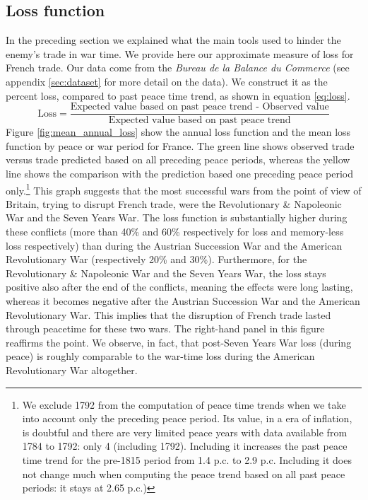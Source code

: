 \documentclass[12pt,a4paper,notitlepage,english]{article}
\begin{document}
\subsection{Loss function}
\label{sec:loss}
In the preceding section we explained what the main tools used to hinder the enemy's trade in war time. We provide here our approximate measure of loss for French trade. Our data come from the \textit{Bureau de la Balance du Commerce} (see appendix \ref{sec:dataset} for more detail on the data). We construct it as the percent loss, compared to past peace time trend, as shown in equation \ref{eq:loss}.
\begin{equation*}
\label{eq:loss}
\text{Loss} = \frac{\text{Expected value based on past peace trend - Observed value}}{\text{Expected value based on past peace trend}}
\end{equation*}
Figure \ref{fig:mean_annual_loss} show the annual loss function and the mean loss function by peace or war period for France. 
The green line shows observed trade versus trade predicted based on all preceding peace periods, whereas the yellow line shows the comparison with the prediction based one preceding peace period only.\footnote{We exclude 1792 from the computation of peace time trends when we take into account only the preceding peace period. Its value, in a era of inflation, is doubtful and there are very limited peace years with data available from 1784 to 1792: only 4 (including 1792). Including it increases the past peace time trend for the pre-1815 period from 1.4 p.c. to 2.9 p.c. Including it does not change much when computing the peace trend based on all past peace periods: it stays at 2.65 p.c.)}
This graph suggests that the most successful wars from the point of view of Britain, trying to disrupt French trade, were the Revolutionary \& Napoleonic War and the Seven Years War.
The loss function is substantially higher during these conflicts (more than 40\% and 60\% respectively for loss and memory-less loss respectively) than during the Austrian Succession War and the American Revolutionary War (respectively 20\% and 30\%).
Furthermore, for the Revolutionary \& Napoleonic War and the Seven Years War, the loss stays positive also after the end of the conflicts, meaning the effects were long lasting, whereas it becomes negative after the Austrian Succession War and the American Revolutionary War. This implies that the disruption of French trade lasted through peacetime for these two wars. The right-hand panel in this figure reaffirms the point. We observe, in fact, that post-Seven Years War loss (during peace) is roughly comparable to the war-time loss during the American Revolutionary War altogether.
\end{document}
